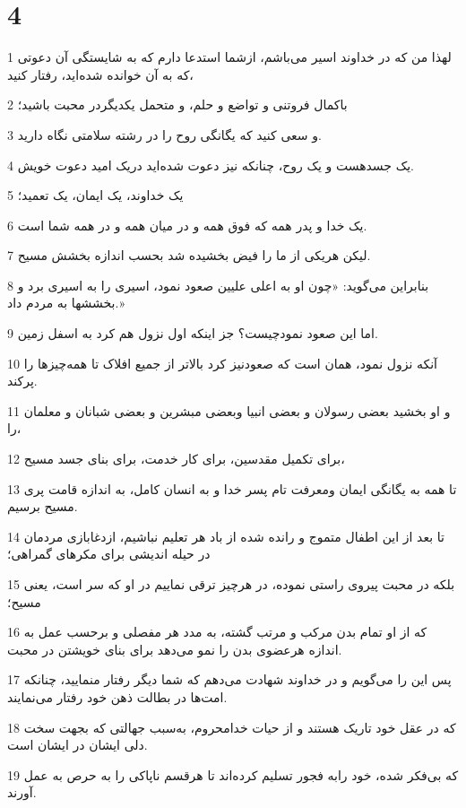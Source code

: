 \chapter{4}

\par 1 لهذا من که در خداوند اسیر می‌باشم، ازشما استدعا دارم که به شایستگی آن دعوتی که به آن خوانده شده‌اید، رفتار کنید،
\par 2 باکمال فروتنی و تواضع و حلم، و متحمل یکدیگردر محبت باشید؛
\par 3 و سعی کنید که یگانگی روح را در رشته سلامتی نگاه دارید.
\par 4 یک جسدهست و یک روح، چنانکه نیز دعوت شده‌اید دریک امید دعوت خویش.
\par 5 یک خداوند، یک ایمان، یک تعمید؛
\par 6 یک خدا و پدر همه که فوق همه و در میان همه و در همه شما است.
\par 7 لیکن هریکی از ما را فیض بخشیده شد بحسب اندازه بخشش مسیح.
\par 8 بنابراین می‌گوید: «چون او به اعلی علیین صعود نمود، اسیری را به اسیری برد و بخششها به مردم داد.»
\par 9 اما این صعود نمودچیست؟ جز اینکه اول نزول هم کرد به اسفل زمین.
\par 10 آنکه نزول نمود، همان است که صعودنیز کرد بالاتر از جمیع افلاک تا همه‌چیزها را پرکند.
\par 11 و او بخشید بعضی رسولان و بعضی انبیا وبعضی مبشرین و بعضی شبانان و معلمان را،
\par 12 برای تکمیل مقدسین، برای کار خدمت، برای بنای جسد مسیح،
\par 13 تا همه به یگانگی ایمان ومعرفت تام پسر خدا و به انسان کامل، به اندازه قامت پری مسیح برسیم.
\par 14 تا بعد از این اطفال متموج و رانده شده از باد هر تعلیم نباشیم، ازدغابازی مردمان در حیله اندیشی برای مکرهای گمراهی؛
\par 15 بلکه در محبت پیروی راستی نموده، در هرچیز ترقی نماییم در او که سر است، یعنی مسیح؛
\par 16 که از او تمام بدن مرکب و مرتب گشته، به مدد هر مفصلی و برحسب عمل به اندازه هرعضوی بدن را نمو می‌دهد برای بنای خویشتن در محبت.
\par 17 پس این را می‌گویم و در خداوند شهادت می‌دهم که شما دیگر رفتار منمایید، چنانکه امت‌ها در بطالت ذهن خود رفتار می‌نمایند.
\par 18 که در عقل خود تاریک هستند و از حیات خدامحروم، به‌سبب جهالتی که بجهت سخت دلی ایشان در ایشان است.
\par 19 که بی‌فکر شده، خود رابه فجور تسلیم کرده‌اند تا هرقسم ناپاکی را به حرص به عمل آورند.
